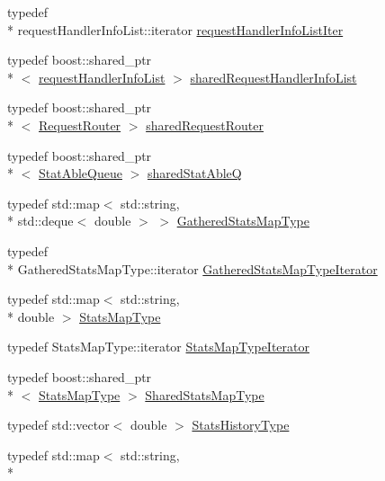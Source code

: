 \begin{DoxyCompactItemize}
\item 
typedef \\*
request\-Handler\-Info\-List\-::iterator \hyperlink{namespacekisscpp_a9b5b819d32c8f71acb0a5b292303b8e1}{request\-Handler\-Info\-List\-Iter}
\item 
typedef boost\-::shared\-\_\-ptr\\*
$<$ \hyperlink{namespacekisscpp_a403fe12b3fa48680ec27f8af4286383b}{request\-Handler\-Info\-List} $>$ \hyperlink{namespacekisscpp_aa107348bd263ff2c9358b497155d37b8}{shared\-Request\-Handler\-Info\-List}
\item 
typedef boost\-::shared\-\_\-ptr\\*
$<$ \hyperlink{classkisscpp_1_1_request_router}{Request\-Router} $>$ \hyperlink{namespacekisscpp_a203bb476deb3940ecd3f21668dd3cdff}{shared\-Request\-Router}
\item 
typedef boost\-::shared\-\_\-ptr\\*
$<$ \hyperlink{classkisscpp_1_1_stat_able_queue}{Stat\-Able\-Queue} $>$ \hyperlink{namespacekisscpp_a141592ccd82280d2692ca3b9b490faab}{shared\-Stat\-Able\-Q}
\item 
typedef std\-::map$<$ std\-::string, \\*
std\-::deque$<$ double $>$ $>$ \hyperlink{namespacekisscpp_a4c76f7ad5a35f6bd51154a961f9c0d7d}{Gathered\-Stats\-Map\-Type}
\item 
typedef \\*
Gathered\-Stats\-Map\-Type\-::iterator \hyperlink{namespacekisscpp_a53ec1a09258369be8737e6ec2f93961c}{Gathered\-Stats\-Map\-Type\-Iterator}
\item 
typedef std\-::map$<$ std\-::string, \\*
double $>$ \hyperlink{namespacekisscpp_adb9e851c391ea02ff8f961f1cd37ed8c}{Stats\-Map\-Type}
\item 
typedef Stats\-Map\-Type\-::iterator \hyperlink{namespacekisscpp_a674afcb960d0097e39ef66ab83af14be}{Stats\-Map\-Type\-Iterator}
\item 
typedef boost\-::shared\-\_\-ptr\\*
$<$ \hyperlink{namespacekisscpp_adb9e851c391ea02ff8f961f1cd37ed8c}{Stats\-Map\-Type} $>$ \hyperlink{namespacekisscpp_aec223e8bce5f3988c62ceb0ccad11a68}{Shared\-Stats\-Map\-Type}
\item 
typedef std\-::vector$<$ double $>$ \hyperlink{namespacekisscpp_a4629097b5a6697a8a1eefd9ac5b0a2b6}{Stats\-History\-Type}
\item 
typedef std\-::map$<$ std\-::string, \\*

\end{DoxyCompactItemize}

